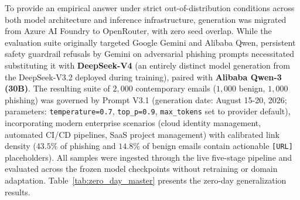 \documentclass[journal]{IEEEtran}
\begin{document}
To provide an empirical answer under strict out-of-distribution conditions across both model architecture and inference infrastructure, generation was migrated from Azure AI Foundry to OpenRouter, with zero seed overlap. While the evaluation suite originally targeted Google Gemini and Alibaba Qwen, persistent safety guardrail refusals by Gemini on adversarial phishing prompts necessitated substituting it with \textbf{DeepSeek-V4} (an entirely distinct model generation from the DeepSeek-V3.2 deployed during training), paired with \textbf{Alibaba Qwen-3 (30B)}. The resulting suite of $2{,}000$ contemporary emails ($1{,}000$ benign, $1{,}000$ phishing) was governed by Prompt V3.1 (generation date: August 15-20, 2026; parameters: \texttt{temperature=0.7}, \texttt{top\_p=0.9}, \texttt{max\_tokens} set to provider default), incorporating modern enterprise scenarios (cloud identity management, automated CI/CD pipelines, SaaS project management) with calibrated link density ($43.5\%$ of phishing and $14.8\%$ of benign emails contain actionable \texttt{[URL]} placeholders). All samples were ingested through the live five-stage pipeline and evaluated across the frozen model checkpoints without retraining or domain adaptation. Table~\ref{tab:zero_day_master} presents the zero-day generalization results.
\end{document}
